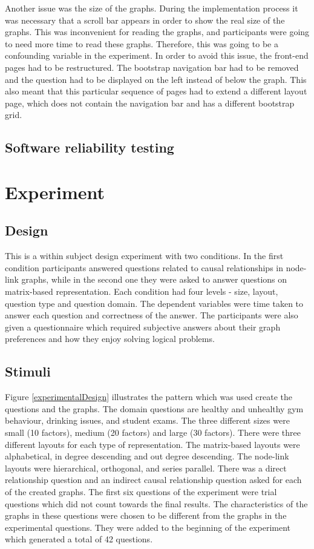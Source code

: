 \documentclass{l4proj}
\begin{document}
Another issue was the size of the graphs. During the implementation process it was necessary that a scroll bar appears in order to show the real size of the graphs. This was inconvenient for reading the graphs, and participants were going to need more time to read these graphs. Therefore, this was going to be a confounding variable in the experiment. In order to avoid this issue, the front-end pages had to be restructured. The bootstrap navigation bar had to be removed and the question had to be displayed on the left instead of below the graph. This also meant that this particular sequence of pages had to extend a different layout page, which does not contain the navigation bar and has a different bootstrap grid.

\section{Software reliability testing}

\chapter{Experiment}
\section{Design}

This is a within subject design experiment with two conditions. In the first condition participants answered questions related to causal relationships in node-link graphs, while in the second one they were asked to answer questions on matrix-based representation. Each condition had four levels - size, layout, question type and question domain. The dependent variables were time taken to answer each question and correctness of the answer. The participants were also given a questionnaire which required subjective answers about their graph preferences and how they enjoy solving logical problems. 

\section{Stimuli}

Figure \ref{experimentalDesign} illustrates the pattern which was used create the questions and the graphs. The domain questions are healthy and unhealthy gym behaviour, drinking issues, and student exams. The three different sizes were small (10 factors), medium (20 factors) and large (30 factors). There were three different layouts for each type of representation. The matrix-based layouts were alphabetical, in degree descending and out degree descending. The node-link layouts were hierarchical, orthogonal, and series parallel.  There was a direct relationship question and an indirect causal relationship question asked for each of the created graphs. The first six questions of the experiment were trial questions which did not count towards the final results. The characteristics of the graphs in these questions were chosen to be different from the graphs in the experimental questions. They were added to the beginning of the experiment which generated a total of 42 questions.
\end{document}
